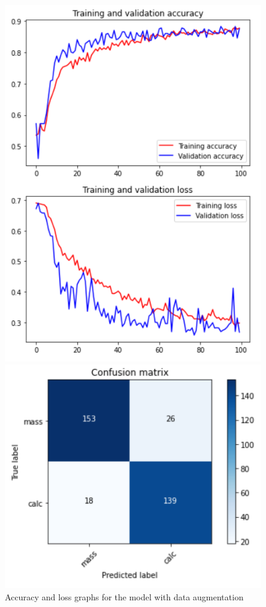 \documentclass[11pt,a4paper,oneside]{article}
\begin{document}
\begin{figure}[hb]
\centering
	\begin{minipage}[c]{.4\textwidth}
		\centering\setlength{\captionmargin}{0pt}%
		\includegraphics[width=.9\textwidth]{images/scratch_DataAugumentation_2.1/test7/2_adam_acc}
		\caption{Accuracy and loss graphs for the model with data augmentation}
		\label{fig:scratch_accuracy_da}
	\end{minipage}
	\hspace{5mm}%
	\begin{minipage}[c]{.4\textwidth}
		\centering\setlength{\captionmargin}{0pt}%
		\includegraphics[width=.9\textwidth]{images/scratch_DataAugumentation_2.1/test7/2_adam_matrix}

\end{minipage}
\end{figure}
\end{document}

